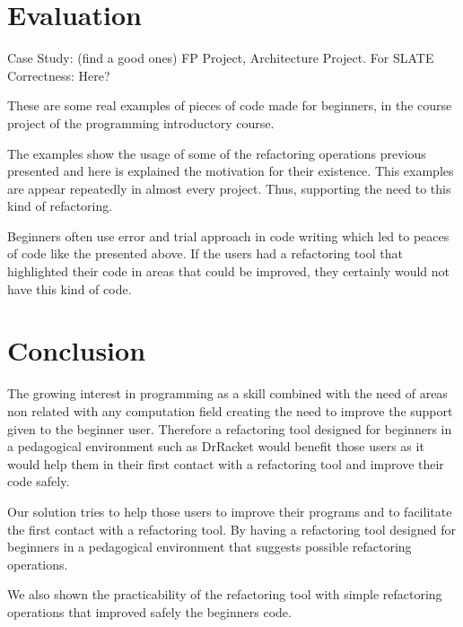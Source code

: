 \section{Evaluation} %
Case Study: (find a good ones) FP Project, Architecture Project. For SLATE
Correctness: Here?


These are some real examples of pieces of code made for beginners, in the course
project of the programming introductory course.


The examples show the usage of some of the refactoring operations previous presented
and here is explained the motivation for their existence.
This examples are appear repeatedly in almost every project.
Thus, supporting the need to this kind of refactoring.

Beginners often use error and trial approach in code writing which led %
to peaces of code like the presented above.
If the users had a refactoring tool that highlighted their code in areas that
could be improved, they certainly would not have this kind of code.


\section{Conclusion}



The growing interest in programming as a skill combined with the need of areas
non related with any computation field creating the need to improve the support
given to the beginner user. %
Therefore a refactoring tool designed for beginners in a pedagogical environment such as DrRacket %
 would benefit those users as it would help them in their first contact with a
 refactoring tool and improve their code safely. %

Our solution tries to help those users to improve their programs and to facilitate
the first contact with a refactoring tool.
By having a refactoring tool designed for beginners in a pedagogical environment
that suggests possible refactoring operations.

We also shown the practicability of the refactoring tool with simple refactoring operations
that improved safely the beginners code.



